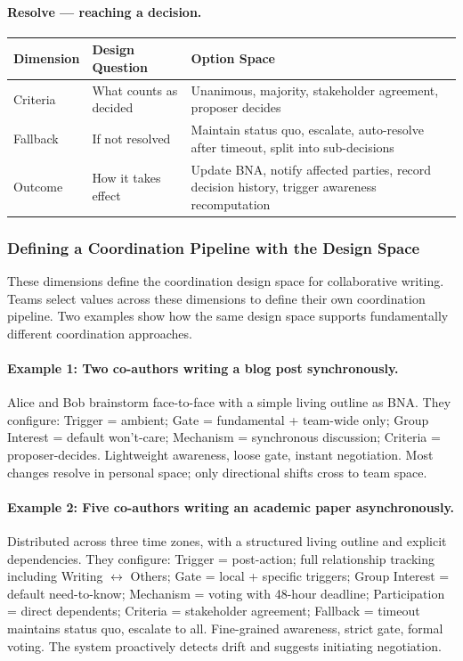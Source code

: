 \paragraph{Resolve --- reaching a decision.}

\begin{table}[h]
\small
\begin{tabular}{@{}lp{2cm}p{4.5cm}@{}}
\toprule
\textbf{Dimension} & \textbf{Design Question} & \textbf{Option Space} \\
\midrule
Criteria & What counts as decided & Unanimous, majority, stakeholder agreement, proposer decides \\
Fallback & If not resolved & Maintain status quo, escalate, auto-resolve after timeout, split into sub-decisions \\
Outcome & How it takes effect & Update BNA, notify affected parties, record decision history, trigger awareness recomputation \\
\bottomrule
\end{tabular}
\end{table}


\subsubsection{Defining a Coordination Pipeline with the Design Space}
\label{sec:pipeline-examples}

These dimensions define the coordination design space for collaborative writing. Teams select values across these dimensions to define their own coordination pipeline. Two examples show how the same design space supports fundamentally different coordination approaches.

\paragraph{Example 1: Two co-authors writing a blog post synchronously.} Alice and Bob brainstorm face-to-face with a simple living outline as BNA. They configure: Trigger = ambient; Gate = fundamental + team-wide only; Group Interest = default won't-care; Mechanism = synchronous discussion; Criteria = proposer-decides. Lightweight awareness, loose gate, instant negotiation. Most changes resolve in personal space; only directional shifts cross to team space.

\paragraph{Example 2: Five co-authors writing an academic paper asynchronously.} Distributed across three time zones, with a structured living outline and explicit dependencies. They configure: Trigger = post-action; full relationship tracking including Writing $\leftrightarrow$ Others; Gate = local + specific triggers; Group Interest = default need-to-know; Mechanism = voting with 48-hour deadline; Participation = direct dependents; Criteria = stakeholder agreement; Fallback = timeout maintains status quo, escalate to all. Fine-grained awareness, strict gate, formal voting. The system proactively detects drift and suggests initiating negotiation.

